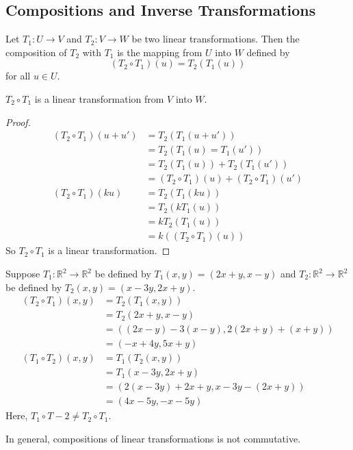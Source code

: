 \documentclass[12pt]{article}
\begin{document}
 \subsection{Compositions and Inverse Transformations} 
 \begin{definition} Let $T_1: U \to V$ and $T_2: V \to W$ be two linear transformations. Then the composition of $T_2$ with $T_1$ is the mapping from $U$ into $W$ defined by $$ (T_2 \circ T_1)(u) = T_2(T_1(u)) $$ for all $u \in U$. \end{definition} 
 \begin{theorem} $T_2 \circ T_1$ is a linear transformation from $V$ into $W$. \end{theorem} 
 \begin{proof} $$\begin{aligned} (T_2 \circ T_1)(u + u') &= T_2(T_1(u + u')) \\ &= T_2(T_1(u) = T_1(u')) \\ &= T_2(T_1(u)) + T_2(T_1(u')) \\ &= (T_2 \circ T_1)(u) + (T_2 \circ T_1)(u') \\ (T_2 \circ T_1)(ku) &= T_2(T_1(ku)) \\ &= T_2(kT_1(u)) \\ &= kT_2(T_1(u)) \\ &= k((T_2 \circ T_1)(u)) \end{aligned} $$ So $T_2 \circ T_1$ is a linear transformation. \end{proof} 
 \begin{example} Suppose $T_1: \mathbb{R}^2 \to \mathbb{R}^2$ be defined by $T_1(x, y) = (2x + y, x - y)$ and $T_2: \mathbb{R}^2 \to \mathbb{R}^2$ be defined by $T_2(x, y) = (x - 3y, 2x + y)$. $$\begin{aligned} (T_2 \circ T_1)(x, y) &= T_2(T_1(x, y)) \\ &= T_2(2x + y, x - y) \\ &= ((2x -y) - 3(x - y), 2(2x + y) + (x + y)) \\ &= (-x + 4y, 5x + y) \\ (T_1 \circ T_2)(x, y) &= T_1(T_2(x, y)) \\ &= T_1(x - 3y, 2x + y) \\ &= (2(x - 3y) + 2x + y, x - 3y - (2x + y)) \\ &= (4x - 5y, -x - 5y) \end{aligned}$$ Here, $T_1 \circ T-2 \neq T_2 \circ T_1$. \end{example} 
 In general, compositions of linear transformations is not commutative. \newline
\end{document}
